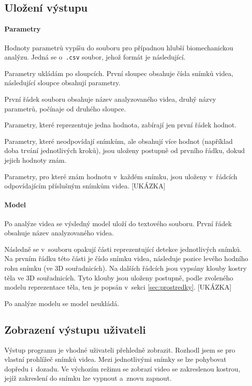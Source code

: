 \subsection{Uložení výstupu}

\paragraph{Parametry}

Hodnoty parametrů vypíšu do souboru pro případnou hlubší biomechanickou analýzu. Jedná se o~\texttt{.csv} soubor, jehož formát je následující.

Parametry ukládám po sloupcích. První sloupec obsahuje čísla snímků videa, následující sloupce obsahují parametry.

První řádek souboru obsahuje název analyzovaného videa, druhý názvy parametrů, počínaje od druhého sloupce.

Parametry, které reprezentuje jedna hodnota, zabírají jen první řádek hodnot.

Parametry, které neodpovídají snímkům, ale obsahují více hodnot (například doba trvání jednotlivých kroků), jsou uloženy postupně od prvního řádku, dokud jejich hodnoty znám.

Parametry, pro které znám hodnotu v~každém snímku, jsou uloženy v~řádcích odpovídajícím příslušným snímkům videa.
[UKÁZKA]

\paragraph{Model}

Po analýze videa se výsledný model uloží do textového souboru. První řádek obsahuje název analyzovaného videa.

Následně se v~souboru opakují části reprezentující detekce jednotlivých snímků. Na prvním řádku této části je číslo snímku videa, následuje pozice levého hodního rohu snímku (ve 3D souřadnicích). Na dalších řádcích jsou vypsány klouby kostry těla ve 3D souřadnicích. Tyto klouby jsou uloženy postupně, podle zvoleného modelu reprezentace těla, ten je popsán v~sekci \ref{sec:prostredky}. [UKÁZKA]

Po analýze modelu se model neukládá.


\subsection{Zobrazení výstupu uživateli}

Výstup programu je vhodné uživateli přehledně zobrazit. Rozhodl jsem se pro vlastní prohlížeč snímků videa. Mezi jednotlivými snímky se lze pohybovat dopředu i~dozadu. Ve výchozím režimu se zobrazí video se zakreslenou kostrou, jejíž zakreslení do snímku lze vypnout a~znovu zapnout.


